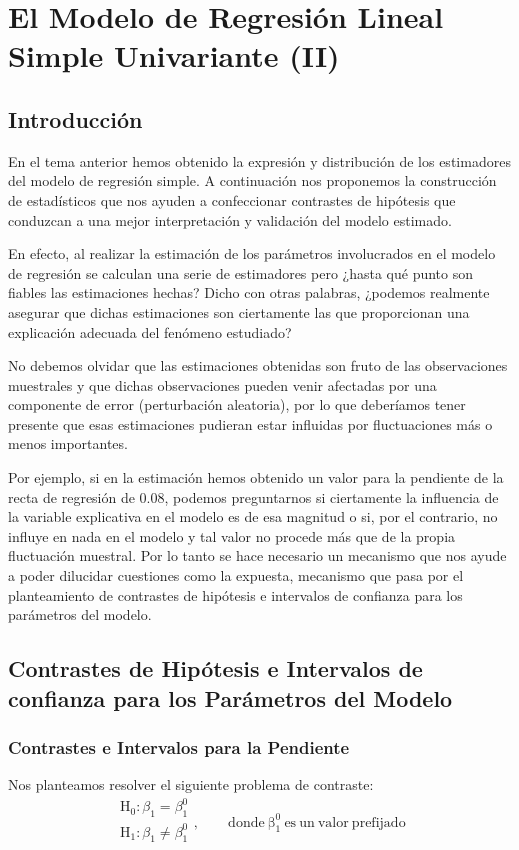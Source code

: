 \documentclass[10pt,a4paper]{book}
\begin{document}
\chapter{El Modelo de Regresión Lineal Simple Univariante (II)}
	\section{Introducción}
En el tema anterior hemos obtenido la expresión y distribución de los estimadores del modelo de regresión simple. A continuación nos proponemos la construcción de estadísticos que nos ayuden a confeccionar contrastes de hipótesis que conduzcan a una mejor interpretación y validación del modelo estimado.

En efecto, al realizar la estimación de los parámetros involucrados en el modelo de regresión se calculan una serie de estimadores pero ¿hasta qué punto son fiables las estimaciones hechas? Dicho con otras palabras, ¿podemos realmente asegurar que dichas estimaciones son ciertamente las que proporcionan una explicación adecuada del fenómeno estudiado?

No debemos olvidar que las estimaciones obtenidas son fruto de las observaciones muestrales y que dichas observaciones pueden venir afectadas por una componente de error (perturbación aleatoria), por lo que deberíamos tener presente que esas estimaciones pudieran estar influidas por fluctuaciones más o menos importantes.

Por ejemplo, si en la estimación hemos obtenido un valor para la pendiente de la recta de regresión de 0.08, podemos preguntarnos si ciertamente la influencia de la variable explicativa en el modelo es de esa magnitud o si, por el contrario, no influye en nada en el modelo y tal valor no procede más que de la propia fluctuación muestral. Por lo tanto se hace necesario un mecanismo que nos ayude a poder dilucidar cuestiones como la expuesta, mecanismo que pasa por el planteamiento de contrastes de hipótesis e intervalos de confianza para los parámetros del modelo.
	\section{Contrastes de Hipótesis e Intervalos de confianza para los Parámetros del Modelo}
		\subsection{Contrastes e Intervalos para la Pendiente}
Nos planteamos resolver el siguiente problema de contraste: 
$$\begin{array}{c}
\mathrm{H_0}:\beta_1=\beta^0_1\\
\mathrm{H_1}:\beta_1\neq\beta^0_1\\
\end{array},\qquad \mathrm{donde\ \beta^0_1\ es\ un\ valor\ prefijado}
$$
\end{document}
